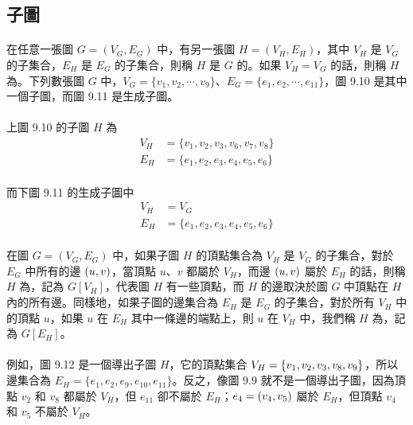 \documentclass[12pt,a4paper,oneside]{report}
\begin{document}
\begin{CJK}{UTF8}{bkai}
\subsection{子圖}
\paragraph{}在任意一張圖 $G=(V_G, E_G)$ 中，有另一張圖 $H=(V_H, E_H)$，其中 $V_H$ 是 $V_G$ 的子集合，$E_H$ 是 $E_G$ 的子集合，則稱 $H$ 是 $G$ 的\textbf{}。如果 $V_H=V_G$ 的話，則稱 $H$ 為\textbf{}。下列數張圖 $G$ 中，$V_G=\{v_1,v_2,\cdots{},v_9\}$、$E_G=\{e_1,e_2,\cdots{},e_{11}\}$，圖 9.10 是其中一個子圖，而圖 9.11 是生成子圖。
\paragraph{}上圖 9.10 的子圖 $H$ 為
\begin{align*}
V_H&=\{v_1,v_2,v_3,v_6,v_7,v_8\}\\
E_H&=\{e_1,e_2,e_3,e_4,e_5,e_6\}
\end{align*}
\paragraph{}而下圖 9.11 的生成子圖中
\begin{align*}
V_H&=V_G\\
E_H&=\{e_1,e_2,e_3,e_4,e_5,e_6\}
\end{align*}
\paragraph{}在圖 $G=(V_G, E_G)$ 中，如果子圖 $H$ 的頂點集合為 $V_H$ 是 $V_G$ 的子集合，對於 $E_G$ 中所有的邊 $({u},{v})$，當頂點 $u$、$v$ 都屬於 $V_H$，而邊 $({u},{v})$ 屬於 $E_H$ 的話，則稱 $H$ 為\textbf{}，記為 $G[V_H]$，代表圖 $H$ 有一些頂點，而 $H$ 的邊取決於圖 $G$ 中頂點在 $H$ 內的所有邊。同樣地，如果子圖的邊集合為 $E_H$ 是 $E_G$ 的子集合，對於所有 $V_H$ 中的頂點 $u$，如果 $u$ 在 $E_H$ 其中一條邊的端點上，則 $u$ 在 $V_H$ 中，我們稱 $H$ 為，記為 $G[E_H]$。
\paragraph{}例如，圖 9.12 是一個導出子圖 $H$，它的頂點集合 $V_H=\{v_1,v_2,v_3,\\v_8,v_9\}$，所以邊集合為 $E_H=\{e_1,e_2,e_9,e_{10},e_{11}\}$。反之，像圖 9.9 就不是一個導出子圖，因為頂點 $v_2$ 和 $v_8$ 都屬於 $V_H$，但 $e_{11}$ 卻不屬於 $E_H$；$e_4=({v_4},{v_5})$ 屬於 $E_H$，但頂點 $v_4$ 和 $v_5$ 不屬於 $V_H$。


\end{CJK}
\end{document}
